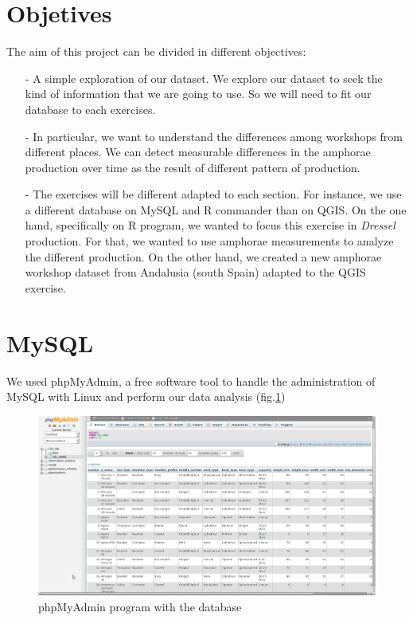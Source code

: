 \documentclass[10pt,a4paper]{article}
\begin{document}
\section{Objetives}

The aim of this project can be divided in different objectives: 

\begin{itemize}
\item[-] A simple exploration of our dataset. We explore our dataset to seek the kind of information that we are going to use. So we will need to fit our database to each exercises. 
\item[-] In particular, we want to understand the differences among workshops from different places. We can detect measurable differences in the amphorae production over time as the result of different pattern of production. 
\item[-] The exercises will be different adapted to each section. For instance, we use a different database on MySQL and R commander than on QGIS. On the one hand, specifically on R program, we wanted to focus this exercise in \textit{Dressel} production. For that, we wanted to use amphorae measurements to analyze the different production. On the other hand, we created a new amphorae workshop dataset from Andalusia (south Spain) adapted to the QGIS exercise. 

\end{itemize}


\section{MySQL}

We used phpMyAdmin, a free software tool to handle the administration of MySQL  with Linux and perform our data analysis (fig.\ref{myphp})

\begin{figure}[htp]
	\centering
\includegraphics[scale=0.25]{picture2.png}
\caption{phpMyAdmin program with the database}
\label{myphp}
\end{figure} 
\end{document}
